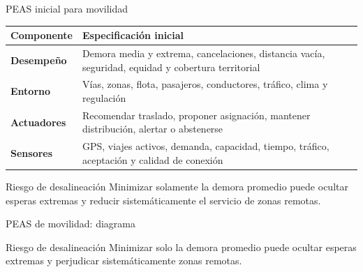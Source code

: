 \documentclass[aspectratio=169,11pt]{beamer}
\begin{document}
\begin{frame}{PEAS inicial para movilidad}
  \scriptsize
  \begin{tabularx}{\textwidth}{>{\bfseries}p{} X}
    \toprule
    Componente & Especificación inicial \\
    \midrule
    Desempeño & Demora media y extrema, cancelaciones, distancia vacía, seguridad, equidad y cobertura territorial \\
    Entorno & Vías, zonas, flota, pasajeros, conductores, tráfico, clima y regulación \\
    Actuadores & Recomendar traslado, proponer asignación, mantener distribución, alertar o abstenerse \\
    Sensores & GPS, viajes activos, demanda, capacidad, tiempo, tráfico, aceptación y calidad de conexión \\
    \bottomrule
  \end{tabularx}
  \vfill
  \begin{alertblock}{Riesgo de desalineación}
    Minimizar solamente la demora promedio puede ocultar esperas extremas y reducir sistemáticamente el servicio de zonas remotas.
  \end{alertblock}
\end{frame}

\begin{frame}{PEAS de movilidad: diagrama}
  \centering
  \vfill
  \begin{alertblock}{Riesgo de desalineación}
    Minimizar solo la demora promedio puede ocultar esperas extremas y perjudicar sistemáticamente zonas remotas.
  \end{alertblock}
\end{frame}
\end{document}
